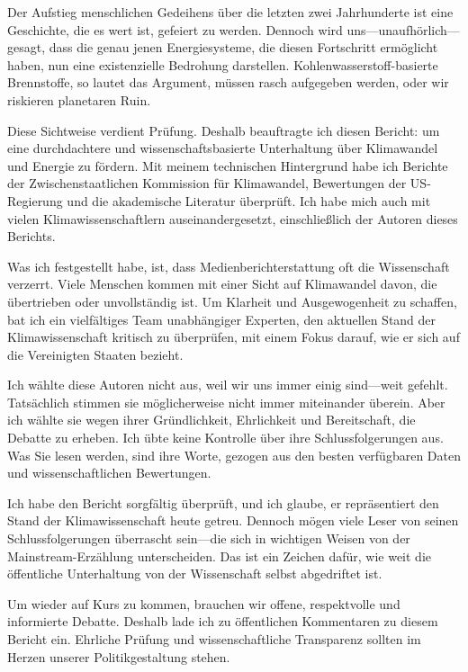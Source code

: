\documentclass[12pt,paper=a4,DIV=12,parskip=never,chapterprefix=false,headings=standardclasses]{scrreprt}
\numberwithin{figure}{chapter}
\begin{document}
Der Aufstieg menschlichen Gedeihens über die letzten zwei Jahrhunderte ist eine Geschichte, die es wert ist, gefeiert zu werden. Dennoch wird uns—unaufhörlich—gesagt, dass die genau jenen Energiesysteme, die diesen Fortschritt ermöglicht haben, nun eine existenzielle Bedrohung darstellen. Kohlenwasserstoff-basierte Brennstoffe, so lautet das Argument, müssen rasch aufgegeben werden, oder wir riskieren planetaren Ruin.

Diese Sichtweise verdient Prüfung. Deshalb beauftragte ich diesen Bericht: um eine durchdachtere und wissenschaftsbasierte Unterhaltung über Klimawandel und Energie zu fördern. Mit meinem technischen Hintergrund habe ich Berichte der Zwischenstaatlichen Kommission für Klimawandel, Bewertungen der US-Regierung und die akademische Literatur überprüft. Ich habe mich auch mit vielen Klimawissenschaftlern auseinandergesetzt, einschließlich der Autoren dieses Berichts.

Was ich festgestellt habe, ist, dass Medienberichterstattung oft die Wissenschaft verzerrt. Viele Menschen kommen mit einer Sicht auf Klimawandel davon, die übertrieben oder unvollständig ist. Um Klarheit und Ausgewogenheit zu schaffen, bat ich ein vielfältiges Team unabhängiger Experten, den aktuellen Stand der Klimawissenschaft kritisch zu überprüfen, mit einem Fokus darauf, wie er sich auf die Vereinigten Staaten bezieht.

Ich wählte diese Autoren nicht aus, weil wir uns immer einig sind—weit gefehlt. Tatsächlich stimmen sie möglicherweise nicht immer miteinander überein. Aber ich wählte sie wegen ihrer Gründlichkeit, Ehrlichkeit und Bereitschaft, die Debatte zu erheben. Ich übte keine Kontrolle über ihre Schlussfolgerungen aus. Was Sie lesen werden, sind ihre Worte, gezogen aus den besten verfügbaren Daten und wissenschaftlichen Bewertungen.

Ich habe den Bericht sorgfältig überprüft, und ich glaube, er repräsentiert den Stand der Klimawissenschaft heute getreu. Dennoch mögen viele Leser von seinen Schlussfolgerungen überrascht sein—die sich in wichtigen Weisen von der Mainstream-Erzählung unterscheiden. Das ist ein Zeichen dafür, wie weit die öffentliche Unterhaltung von der Wissenschaft selbst abgedriftet ist.

Um wieder auf Kurs zu kommen, brauchen wir offene, respektvolle und informierte Debatte. Deshalb lade ich zu öffentlichen Kommentaren zu diesem Bericht ein. Ehrliche Prüfung und wissenschaftliche Transparenz sollten im Herzen unserer Politikgestaltung stehen.
\end{document}
